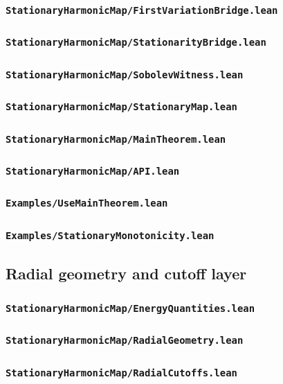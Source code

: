 \documentclass[reqno,11pt]{amsart}
\numberwithin{equation}{section}
\theoremstyle{plain}
\theoremstyle{definition}
\theoremstyle{remark}
\begin{document}
\subsubsection*{\texttt{StationaryHarmonicMap/FirstVariationBridge.lean}}
\subsubsection*{\texttt{StationaryHarmonicMap/StationarityBridge.lean}}
\subsubsection*{\texttt{StationaryHarmonicMap/SobolevWitness.lean}}
\subsubsection*{\texttt{StationaryHarmonicMap/StationaryMap.lean}}
\subsubsection*{\texttt{StationaryHarmonicMap/MainTheorem.lean}}
\subsubsection*{\texttt{StationaryHarmonicMap/API.lean}}
\subsubsection*{\texttt{Examples/UseMainTheorem.lean}}
\subsubsection*{\texttt{Examples/StationaryMonotonicity.lean}}

\subsection{Radial geometry and cutoff layer}

\subsubsection*{\texttt{StationaryHarmonicMap/EnergyQuantities.lean}}
\subsubsection*{\texttt{StationaryHarmonicMap/RadialGeometry.lean}}
\subsubsection*{\texttt{StationaryHarmonicMap/RadialCutoffs.lean}}
\end{document}
